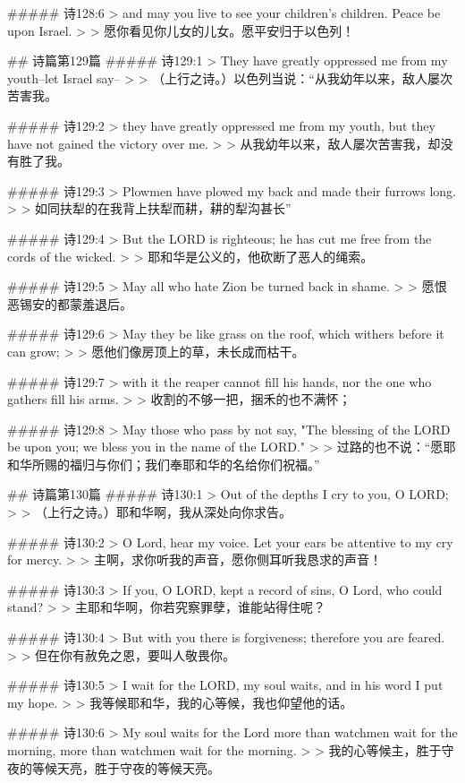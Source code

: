 ##### 诗128:6
> and may you live to see your children's children. Peace be upon Israel.
>
> 愿你看见你儿女的儿女。愿平安归于以色列！


## 诗篇第129篇
##### 诗129:1
> They have greatly oppressed me from my youth--let Israel say--
>
> （上行之诗。）以色列当说：“从我幼年以来，敌人屡次苦害我。


##### 诗129:2
> they have greatly oppressed me from my youth, but they have not gained the victory over me.
>
> 从我幼年以来，敌人屡次苦害我，却没有胜了我。


##### 诗129:3
> Plowmen have plowed my back and made their furrows long.
>
> 如同扶犁的在我背上扶犁而耕，耕的犁沟甚长”


##### 诗129:4
> But the LORD is righteous; he has cut me free from the cords of the wicked.
>
> 耶和华是公义的，他砍断了恶人的绳索。


##### 诗129:5
> May all who hate Zion be turned back in shame.
>
> 愿恨恶锡安的都蒙羞退后。


##### 诗129:6
> May they be like grass on the roof, which withers before it can grow;
>
> 愿他们像房顶上的草，未长成而枯干。


##### 诗129:7
> with it the reaper cannot fill his hands, nor the one who gathers fill his arms.
>
> 收割的不够一把，捆禾的也不满怀；


##### 诗129:8
> May those who pass by not say, "The blessing of the LORD be upon you; we bless you in the name of the LORD."
>
> 过路的也不说：“愿耶和华所赐的福归与你们；我们奉耶和华的名给你们祝福。”


## 诗篇第130篇
##### 诗130:1
> Out of the depths I cry to you, O LORD;
>
> （上行之诗。）耶和华啊，我从深处向你求告。


##### 诗130:2
> O Lord, hear my voice. Let your ears be attentive to my cry for mercy.
>
> 主啊，求你听我的声音，愿你侧耳听我恳求的声音！


##### 诗130:3
> If you, O LORD, kept a record of sins, O Lord, who could stand?
>
> 主耶和华啊，你若究察罪孽，谁能站得住呢？


##### 诗130:4
> But with you there is forgiveness; therefore you are feared.
>
> 但在你有赦免之恩，要叫人敬畏你。


##### 诗130:5
> I wait for the LORD, my soul waits, and in his word I put my hope.
>
> 我等候耶和华，我的心等候，我也仰望他的话。


##### 诗130:6
> My soul waits for the Lord more than watchmen wait for the morning, more than watchmen wait for the morning.
>
> 我的心等候主，胜于守夜的等候天亮，胜于守夜的等候天亮。


